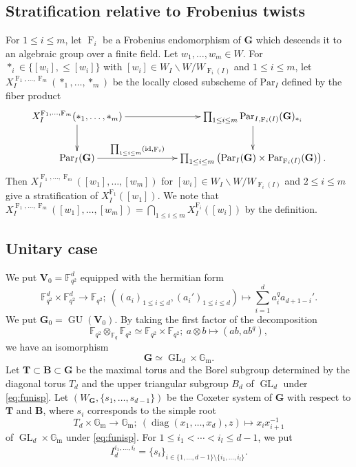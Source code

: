 \documentclass[12pt,a4paper]{article}
\DeclareMathOperator{\id}{id}
\DeclareMathOperator{\diag}{diag}
\DeclareMathOperator{\Par}{Par}
\DeclareMathOperator{\GL}{GL}
\DeclareMathOperator{\GU}{GU}
\DeclareMathOperator{\oF}{F}
\newcommand{\bF}{\mathbb{F}}
\newcommand{\bfB}{\mathbf{B}}
\newcommand{\bfG}{\mathbf{G}}
\newcommand{\bfT}{\mathbf{T}}
\newcommand{\bfV}{\mathbf{V}}
\newcommand{\Gm}{\mathbb{G}_{\mathrm{m}}}
\begin{document}
\subsection{Stratification relative to Frobenius twists}
For $1 \leq i \leq m$, 
let $\oF_i$ be a Frobenius endomorphism of 
$\bfG$ which descends it to an algebraic group over a finite field. 
Let $w_1,\ldots ,w_m \in W$. 
For $*_i \in \{ [w_i], {\leq}[w_i] \}$ 
with $[w_i] \in W_I \backslash W /W_{\oF_i(I)}$ and $1 \leq i \leq m$, 
let $X_{I}^{\oF_1,\ldots,\oF_m}(*_1,\ldots,*_m)$ 
be the locally closed subscheme of $\mathrm{Par}_I$ 
defined by the fiber product 
\[
 \xymatrix{
 X_{I}^{\oF_1,\ldots,\oF_m}(*_1,\ldots,*_m) \ar[rr] \ar[d] & &  \prod_{1 \leq i \leq m} \Par_{I,\oF_i(I)} (\bfG)_{*_i}         \ar[d] \\ 
  \Par_I (\bfG)  \ar[rr]^-{\prod_{1 \leq i \leq m} (\id ,\oF_i)}   & & \prod_{1 \leq i \leq m} \left( \Par_I (\bfG) \times \Par_{\oF_i(I)} (\bfG) \right).} 
\]
Then 
$X_{I}^{\oF_1,\ldots,\oF_m}([w_1],\ldots,[w_m])$ for $[w_i] \in W_I \backslash W /W_{\oF_i(I)}$ and $2 \leq i \leq m$ 
give a stratification of 
$X_{I}^{\oF_1}([w_1])$. 
We note that 
$X_{I}^{\oF_1,\ldots,\oF_m}([w_1],\ldots,[w_m])=\bigcap_{1 \leq i \leq m} X_{I}^{\oF_i}([w_i])$ by the definition. 

\subsection{Unitary case}
We put $\bfV_0=\bF_{q^2}^d$ equipped with the hermitian form 
\begin{equation}\label{eq:Herpair}
 \bF_{q^2}^d \times \bF_{q^2}^d \to \bF_{q^2};\ 
 ((a_i)_{1 \leq i \leq d},(a_i')_{1 \leq i \leq d}) 
 \mapsto \sum_{i=1}^d a_i^q a_{d+1-i}' . 
\end{equation}
We put $\bfG_0=\GU (\bfV_0)$. 
By taking the first factor of the decomposition 
\[
 \bF_{q^2} \otimes_{\bF_q} \bF_{q^2} \simeq \bF_{q^2} \times \bF_{q^2};\ 
 a \otimes b \mapsto (ab,ab^q) , 
\]
we have an isomorphism 
\begin{equation}\label{eq:funisp}
 \bfG \simeq \GL_d \times \Gm . 
\end{equation}
Let $\bfT \subset \bfB \subset \bfG$ be the maximal torus and the Borel subgroup determined by 
the diagonal torus $T_d$ and the upper triangular subgroup $B_d$ of $\GL_d$ 
under \eqref{eq:funisp}. 
Let $(W_{\bfG},\{ s_1,\ldots ,s_{d-1} \})$ 
be the Coxeter system of $\bfG$ with respect to $\bfT$ and $\bfB$, 
where $s_i$ corresponds to the simple root 
\[
 T_d \times \Gm \to \Gm ;\ (\diag (x_1,\ldots,x_d),z) 
 \mapsto x_i x_{i+1}^{-1} 
\]
of $\GL_d \times \Gm$ under \eqref{eq:funisp}. 
For $1 \leq i_1 < \cdots < i_l \leq d-1$, 
we put 
\[
 I_{d}^{i_1,\ldots,i_l} = \{ s_i \}_{i \in \{ 1, \ldots, d-1 \} \setminus \{ i_1,\ldots,i_l\} }. 
\]
\end{document}
